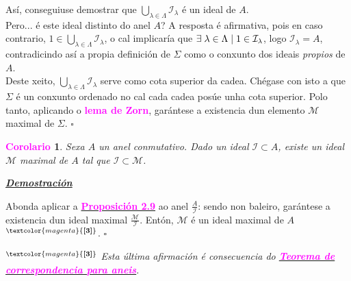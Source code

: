 \documentclass[twoside]{report}
\newcommand{\magbf}[1]{\textcolor{magenta}{\textbf{#1}}} %
\theoremstyle{mystyle}
\newtheorem{cor}{\magbf{Corolario}}[chapter]
\newenvironment{corollary}
{\begin{mdframed}[linecolor = magenta,backgroundcolor = classicrose, linewidth = 2mm]\begin{cor}}
{\end{cor}\end{mdframed}}
\begin{document}
\noindent Así, conseguiuse demostrar que $\underset{\lambda \in \Lambda}{\bigcup}\mathcal{I_{\lambda}}$ é un ideal de $A$.\\

\noindent Pero... é este ideal distinto do anel $A$? A resposta é afirmativa, pois en caso contrario, $1 \in \underset{\lambda \in \Lambda}{\bigcup}\mathcal{I_{\lambda}}$, o cal implicaría que $\exists \hspace{1mm} \lambda \in \Lambda \hspace{1mm} | \hspace{1mm} 1 \in \mathcal{I}_{\lambda}$, logo $\mathcal{I}_{\lambda} = A$, contradicindo así a propia definición de $\Sigma$ como o conxunto dos ideais \textit{propios} de $A$.\\

\noindent Deste xeito, $\underset{\lambda \in \Lambda}{\bigcup}\mathcal{I_{\lambda}}$ serve como cota superior da cadea. Chégase con isto a que $\Sigma$ é un conxunto ordenado no cal cada cadea posúe unha cota superior. Polo tanto, aplicando o \magbf{lema de Zorn}, garántese a existencia dun elemento $\mathcal{M}$ maximal de $\Sigma$. $\square$\\

\vspace{3mm}

\begin{corollary} \label{cor2.2}
Sexa $A$ un anel conmutativo. Dado un ideal $\mathcal{I} \subset A$, existe un ideal $\mathcal{M}$ maximal de $A$ tal que $\mathcal{I \subset M}$.
\end{corollary}

\noindent \textbf{\textit{\underline{Demostración}}}

\vspace{2mm}

\noindent Abonda aplicar a \hyperref[prop2.9]{\magbf{Proposición 2.9}} ao anel $\displaystyle \frac{A}{\mathcal{I}}$: sendo non baleiro, garántese a existencia dun ideal maximal $\displaystyle \frac{\mathcal{M}}{\mathcal{I}}$. Entón, $\mathcal{M}$ é un ideal maximal de $A$ $^{\magbf{[3]}}$. $\square$\\

\vspace{3mm}

\noindent $^{\magbf{[3]}}$ \textit{Esta última afirmación é consecuencia do \hyperref[th2.4]{\magbf{Teorema de correspondencia para aneis}}}.\\

\vspace{3mm}
\end{document}
